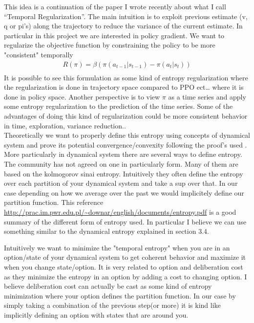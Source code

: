 This idea is a continuation of the paper I wrote recently about what I call “Temporal Regularization”. The main intuition is to exploit previous estimate (v, q or pi’s) along the trajectory to reduce the variance of the current estimate. In particular in this project we are interested in policy gradient. We want to regularize the objective function by constraining the policy to be more "consistent" temporally 
\begin{equation}
\begin{split}
    R(\pi) = \beta ( \pi(a_{t-1}|s_{t-1}) - \pi(a_t|s_t)) \\
\end{split}
\end{equation}
It is possible to see this formulation as some kind of entropy regularization where the regularization is done in trajectory space compared to PPO ect… where it is done in policy space. Another perspective is to view $\pi$ as a time series and apply some entropy regularization to the prediction of the time series. Some of the advantages of doing this kind of regularization could be more consistent behavior in time, exploration, variance reduction.. \\
Theoretically we want to properly define this entropy using concepts of dynamical system and prove its potential convergence/convexity following the proof's used \cite{neu2017unified}.\\
More particularly in dynamical system there are several ways to define entropy. The community has not agreed on one in particularly form. Many of them are based on the kolmogorov sinai entropy. Intuitively they often define the entropy over each partition of your dynamical system and take a sup over that. In our case depending on how we average over the past we would implicitely define our partition function. This reference \url{http://prac.im.pwr.edu.pl/~downar/english/documents/entropy.pdf} is a good summary of the different form of entropy used. In particular I believe we can use something similar to the dynamical entropy explained in section 3.4.

Intuitively we want to minimize the "temporal entropy" when you are in an option/state of your dynamical system to get coherent behavior and maximize it when you change state/option. It is very related to option and deliberation cost \cite{harb2017waiting} as they minimize the entropy in an option by adding a cost to changing option. I believe deliberation cost can actually be cast as some kind of entropy minimization where your option defines the partition function. In our case by simply taking a combination of the previous step(or more) it is kind like implicitly defining an option with states that are around you.
